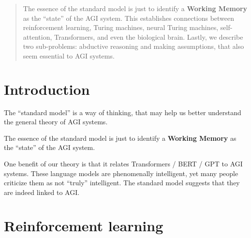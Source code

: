 \maketitle

\begin{abstract}
The essence of the standard model is just to identify a \textbf{Working Memory} as the ``state'' of the AGI system.  This establishes connections between reinforcement learning, Turing machines, neural Turing machines, self-attention, Transformers, and even the biological brain.  Lastly, we describe two sub-problems: abductive reasoning and making assumptions, that also seem essential to AGI systems.
\end{abstract}


\setcounter{section}{-1}
\section{Introduction}

The ``standard model'' is a way of thinking, that may help us better understand the general theory of AGI systems.

The essence of the standard model is just to identify a \textbf{Working Memory} as the ``state'' of the AGI system.

One benefit of our theory is that it relates Transformers / BERT / GPT to AGI systems.  These language models are phenomenally intelligent, yet many people criticize them as not ``truly'' intelligent.  The standard model suggests that they are indeed linked to AGI.

\section{Reinforcement learning}

